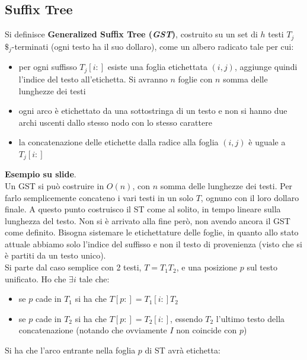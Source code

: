 \documentclass[a4paper,12pt, oneside]{book}
\begin{document}
\subsection{Suffix Tree}
\begin{definizione}
  Si definisce \textbf{Generalized Suffix Tree (\textit{GST})}, costruito su un
  set di $h$ testi $T_j$ $\$_j$-terminati (ogni testo ha il suo dollaro), come
  un albero radicato tale per cui: 
  \begin{itemize}
    \item per ogni suffisso $T_j[i:]$ esiste una foglia etichettata $(i,j)$,
    aggiunge quindi l'indice del testo all'etichetta. Si avranno $n$ foglie con
    $n$ somma delle lunghezze dei testi
    \item ogni arco è etichettato da una sottostringa di un testo e non si hanno
    due archi uscenti dallo stesso nodo con lo stesso carattere
    \item la concatenazione delle etichette dalla radice alla foglia $(i,j)$ è
    uguale a $T_j[i:]$
  \end{itemize}
\end{definizione}
\textbf{Esempio su slide}.\\
Un GST si può costruire in $O(n)$, con $n$ somma delle lunghezze dei testi. Per
farlo semplicemente concateno i vari testi in un solo $T$, ognuno con il loro
dollaro finale. A questo punto costruisco il ST come al solito, in tempo lineare
sulla lunghezza del testo. Non si è arrivato alla fine però, non avendo ancora
il GST come definito. Bisogna sistemare le etichettature delle foglie, in quanto
allo stato attuale abbiamo solo l'indice del suffisso e non il testo di
provenienza (visto che si è partiti da un testo unico).\\
Si parte dal caso semplice con 2 testi, $T=T_1T_2$, e una posizione $p$ sul
testo unificato. Ho che $\exists i$ tale che:
\begin{itemize}
  \item se $p$ cade in $T_1$ si ha che $T[p:]=T_1[i:]T_2$
  \item se $p$ cade in $T_2$ si ha che $T[p:]=T_2[i:]$, essendo $T_2$ l'ultimo
  testo della concatenazione (notando che ovviamente $I$ non coincide con $p$)
\end{itemize}
Si ha che l'arco entrante nella foglia $p$ di ST avrà etichetta:
\end{document}
